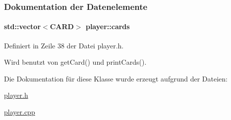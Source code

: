 \subsubsection{Dokumentation der Datenelemente}
\hypertarget{classplayer_aceb04c78e103fb236c37fe33354032a9}{
\paragraph[{cards}]{\setlength{\rightskip}{0pt plus 5cm}std\-::vector$<${\bf C\-A\-R\-D}$>$ player\-::cards\hspace{0.3cm}{\ttfamily [private]}}}\label{classplayer_aceb04c78e103fb236c37fe33354032a9}


Definiert in Zeile 38 der Datei player.\-h.



Wird benutzt von get\-Card() und print\-Cards().



Die Dokumentation für diese Klasse wurde erzeugt aufgrund der Dateien\-:\begin{DoxyCompactItemize}
\item 
\hyperlink{player_8h}{player.\-h}\item 
\hyperlink{player_8cpp}{player.\-cpp}\end{DoxyCompactItemize}
